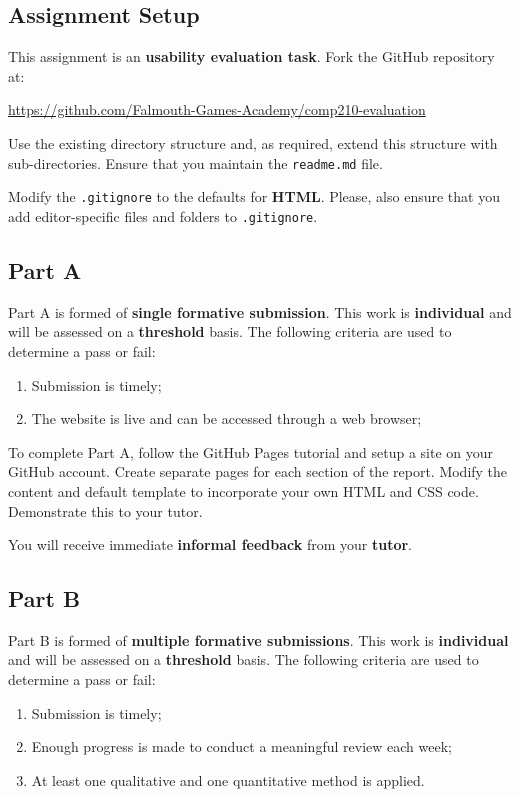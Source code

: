 \documentclass{../../fal_assignment}
\begin{document}
\subsection*{Assignment Setup}

This assignment is an \textbf{usability evaluation task}. Fork the GitHub repository at:

\indent \url{https://github.com/Falmouth-Games-Academy/comp210-evaluation}

Use the existing directory structure and, as required, extend this structure with sub-directories. Ensure that you maintain the \texttt{readme.md} file.

Modify the \texttt{.gitignore} to the defaults for \textbf{HTML}. Please, also ensure that you add editor-specific files and folders to \texttt{.gitignore}. 

\subsection*{Part A}

Part A is formed of \textbf{single formative submission}. This work is \textbf{individual} and will be assessed on a \textbf{threshold} basis. The following criteria are used to determine a pass or fail:

\begin{enumerate}[label=(\alph*)]
	\item Submission is timely;
	\item The website is live and can be accessed through a web browser;
\end{enumerate}

To complete Part A, follow the GitHub Pages tutorial and setup a site on your GitHub account. Create separate pages for each section of the report. Modify the content and default template to incorporate your own HTML and CSS code. Demonstrate this to your tutor.

You will receive immediate \textbf{informal feedback} from your \textbf{tutor}.

\subsection*{Part B}

Part B is formed of \textbf{multiple formative submissions}. This work is \textbf{individual} and will be assessed on a \textbf{threshold} basis. The following criteria are used to determine a pass or fail:

\begin{enumerate}[label=(\alph*)]
	\item Submission is timely;
	\item Enough progress is made to conduct a meaningful review each week;
	\item At least one qualitative and one quantitative method is applied.
\end{enumerate}
\end{document}

